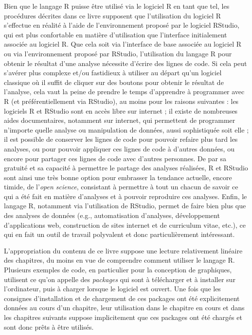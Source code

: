 \documentclass[
  french,
]{book}
\begin{document}
Bien que le langage R puisse être utilisé via le logiciel R en tant que tel, les procédures décrites dans ce livre supposent que l'utilisation du logiciel R s'effectue en réalité à l'aide de l'environnement proposé par le logiciel RStudio, qui est plus confortable en matière d'utilisation que l'interface initialement associée au logiciel R. Que cela soit via l'interface de base associée au logiciel R ou via l'environnement proposé par RStudio, l'utilisation du langage R pour obtenir le résultat d'une analyse nécessite d'écrire des lignes de code. Si cela peut s'avérer plus complexe et/ou fastidieux à utiliser au départ qu'un logiciel classique où il suffit de cliquer sur des boutons pour obtenir le résultat de l'analyse, cela vaut la peine de prendre le temps d'apprendre à programmer avec R (et préférentiellement via RStudio), au moins pour les raisons suivantes : les logiciels R et RStudio sont en accès libre sur internet ; il existe de nombreuses aides documentaires, notamment sur internet, qui permettent de programmer n'importe quelle analyse ou manipulation de données, aussi sophistiquée soit elle ; il est possible de conserver les lignes de code pour pouvoir refaire plus tard les analyses, ou pour pouvoir appliquer ces lignes de code à d'autres données, ou encore pour partager ces lignes de code avec d'autres personnes. De par sa gratuité et sa capacité à permettre le partage des analyses réalisées, R et RStudio sont ainsi une très bonne option pour embrasser la tendance actuelle, encore timide, de l'\emph{open science}, consistant à permettre à tout un chacun de savoir ce qui a été fait en matière d'analyses et à pouvoir reproduire ces analyses. Enfin, le langage R, notamment via l'utilisation de RStudio, permet de faire bien plus que des analyses de données (e.g., automatisation d'analyses, développement d'applications web, construction de sites internet et de curriculum vitae, etc.), ce qui en fait un outil de travail polyvalent et donc particulièrement intéressant.

L'appropriation du contenu de ce livre suppose une lecture relativement linéaire des chapitres, du moins en vue de comprendre comment utiliser le langage R. Plusieurs exemples de code, en particulier pour la conception de graphiques, utilisent ce qu'on appelle des \emph{packages} qui sont à télécharger et à installer sur l'ordinateur, puis à charger lorsque le logiciel est ouvert. Une fois que les consignes d'installation et de chargement de ces packages ont été explicitement données au cours d'un chapitre, leur utilisation dans le chapitre en cours et dans les chapitres suivants suppose implicitement que ces packages ont été chargés et sont donc prêts à être utilisés.
\end{document}
